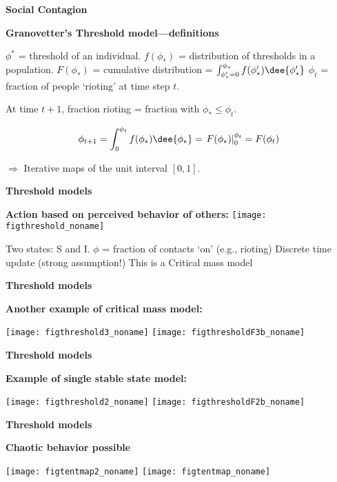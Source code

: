   \textbf{Social Contagion}
  
  \textbf{Granovetter's Threshold model---definitions}
    
     $\phi^\ast$ = threshold of an individual.
     $f(\phi_\ast)$ = distribution of thresholds in a population.
     $F(\phi_\ast)$ = cumulative distribution = 
      $\int_{\phi_\ast'=0}^{\phi_\ast} f(\phi_\ast') \dee{\phi_\ast'}$
     $\phi_t$ = fraction of people `rioting' at time step $t$.
    
  
  
  
    
    
      At time $t+1$, fraction rioting
      = fraction with $\phi_\ast \le \phi_t$.
    
      \[ \phi_{t+1} = \int_{0}^{\phi_t} f(\phi_\ast) \dee{\phi_\ast}
      = \left. F(\phi_\ast) \right|_{0}^{\phi_t} = F(\phi_t) \]
    
      $\Rightarrow$ Iterative maps of the unit interval $[0, 1]$.
    
   


  \textbf{Threshold models}

  \textbf{Action based on perceived behavior of others:}
    \texttt{[image: figthreshold\_noname]}
    
     Two states: S and I.
     $\phi$ = fraction of contacts `on' (e.g., rioting)
     Discrete time update (strong assumption!)
     This is a \alert{Critical mass model}
  
  



   \textbf{Threshold models}

   \textbf{ Another example of critical mass model:}
     \begin{center}
     \texttt{[image: figthreshold3\_noname]}
     \texttt{[image: figthresholdF3b\_noname]}
     \end{center}
   


  \textbf{Threshold models}

  \textbf{Example of single stable state model:}
    \begin{center}
      \texttt{[image: figthreshold2\_noname]}
      \texttt{[image: figthresholdF2b\_noname]}
    \end{center}
  



  \textbf{Threshold models}

  \textbf{Chaotic behavior possible\cite{granovetter1986a,granovetter1988a}}
  \begin{center}
    \texttt{[image: figtentmap2\_noname]} 
    \texttt{[image: figtentmap\_noname]} 
  \end{center}

